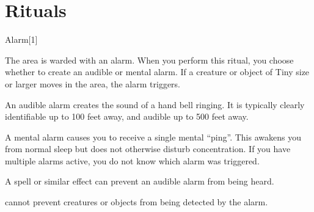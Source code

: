 \section{Rituals}

\small

\begin{spellsection}{Alarm}[1]
    \begin{spellheader}
    \end{spellheader}
    \begin{spellcontent}
        \begin{spelltargetinginfo}
        \end{spelltargetinginfo}
        \begin{spelleffects}
            \spelleffect The area is warded with an alarm. When you perform this ritual, you choose whether to create an audible or mental alarm. If a creature or object of Tiny size or larger moves in the area, the alarm triggers.

            An audible alarm creates the sound of a hand bell ringing. It is typically clearly identifiable up to 100 feet away, and audible up to 500 feet away.

            A mental alarm causes you to receive a single mental ``ping''. This awakens you from normal sleep but does not otherwise disturb concentration. If you have multiple alarms active, you do not know which alarm was triggered.
            \spelldur \durext \dismissable
        \end{spelleffects}
    \end{spellcontent}
    \begin{spellfooter}
        \spellnotes A  spell or similar effect can prevent an audible alarm from being heard.

         cannot prevent creatures or objects from being detected by the alarm.
    \end{spellfooter}
    \begin{spellaugments}
    \end{spellaugments}
\end{spellsection}

